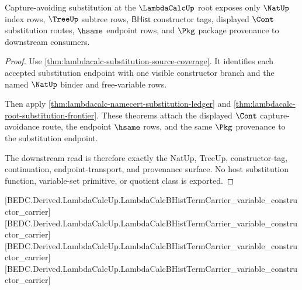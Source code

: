 \begin{theorem}
\label{thm:lambdacalc-root-obligation-substitution-ledger}
Capture-avoiding substitution at the $\LambdaCalcUp$ root exposes only
$\NatUp$ index rows, $\TreeUp$ subtree rows, $\mathsf{BHist}$ constructor tags,
displayed $\Cont$ substitution routes, $\hsame$ endpoint rows, and $\Pkg$
package provenance to downstream consumers.
\end{theorem}
\begin{proof}
Use \autoref{thm:lambdacalc-substitution-source-coverage}. It identifies each
accepted substitution endpoint with one visible constructor branch and the
named $\NatUp$ binder and free-variable rows.

Then apply \autoref{thm:lambdacalc-namecert-substitution-ledger} and
\autoref{thm:lambdacalc-root-substitution-frontier}. These theorems attach the
displayed $\Cont$ capture-avoidance route, the endpoint $\hsame$ rows, and the
same $\Pkg$ provenance to the substitution endpoint.

The downstream read is therefore exactly the NatUp, TreeUp, constructor-tag,
continuation, endpoint-transport, and provenance surface. No host substitution
function, variable-set primitive, or quotient class is exported.
\end{proof}

[BEDC.Derived.LambdaCalcUp.LambdaCalcBHistTermCarrier\_variable\_constructor\_carrier]
[BEDC.Derived.LambdaCalcUp.LambdaCalcBHistTermCarrier\_variable\_constructor\_carrier]
[BEDC.Derived.LambdaCalcUp.LambdaCalcBHistTermCarrier\_variable\_constructor\_carrier]
[BEDC.Derived.LambdaCalcUp.LambdaCalcBHistTermCarrier\_variable\_constructor\_carrier]

